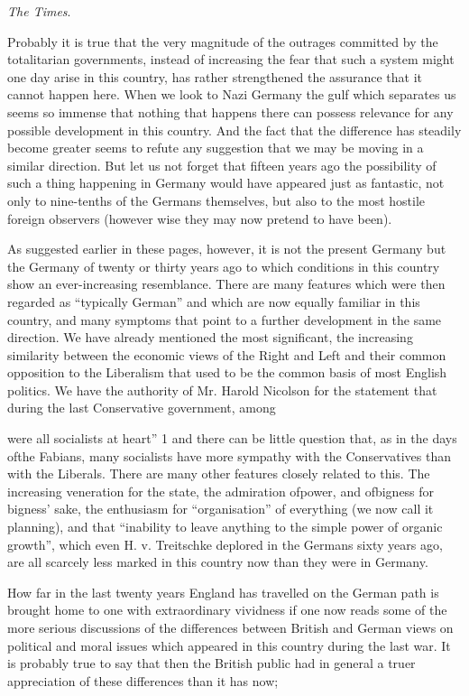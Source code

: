 \documentclass[11pt,openany]{book}
\begin{document}
\emph{The Times}.

Probably it is true that the very magnitude of the outrages committed by the totalitarian governments, instead of increasing the fear that such a system might one day arise in this country, has rather strengthened the assurance that it cannot happen here. When we look to Nazi Germany the gulf which separates us seems so immense that nothing that happens there can possess relevance for any possible development in this country. And the fact that the difference has steadily become greater seems to refute any suggestion that we may be moving in a similar direction. But let us not forget that fifteen years ago the possibility of such a thing happening in Germany would have appeared just as fantastic, not only to nine-tenths of the Germans themselves, but also to the most hostile foreign observers (however wise they may now pretend to have been).

As suggested earlier in these pages, however, it is not the present Germany but the Germany of twenty or thirty years ago to which conditions in this country show an ever-increasing resemblance. There are many features which were then regarded as ``typically German'' and which are now equally familiar in this country, and many symptoms that point to a further development in the same direction. We have already mentioned the most significant, the increasing similarity between the economic views of the Right and Left and their common opposition to the Liberalism that used to be the common basis of most English politics. We have the authority of Mr. Harold Nicolson for the statement that during the last Conservative government, among

were all socialists at heart'' 1 and there can be little question that, as in the days ofthe Fabians, many socialists have more sympathy with the Conservatives than with the Liberals. There are many other features closely related to this. The increasing veneration for the state, the admiration ofpower, and ofbigness for bigness' sake, the enthusiasm for ``organisation'' of everything (we now call it planning), and that ``inability to leave anything to the simple power of organic growth'', which even H. v. Treitschke deplored in the Germans sixty years ago, are all scarcely less marked in this country now than they were in Germany.

How far in the last twenty years England has travelled on the German path is brought home to one with extraordinary vividness if one now reads some of the more serious discussions of the differences between British and German views on political and moral issues which appeared in this country during the last war. It is probably true to say that then the British public had in general a truer appreciation of these differences than it has now;
\end{document}
